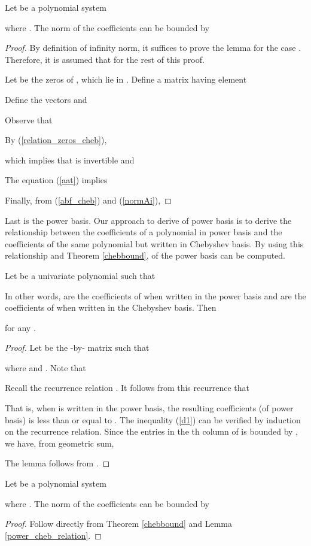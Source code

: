 \documentclass[12pt]{article}
\begin{document}
\begin{thm}
\label{chebbound} Let  be a polynomial system

where . The norm of the coefficients
can be bounded by

\end{thm}
\begin{proof}
By definition of infinity norm, it suffices to prove the lemma for
the case .  Therefore, it is assumed that
 for the rest of this proof.

Let   be the  zeros of ,
which lie in . Define a matrix  having element

Define the vectors  and

Observe that

By (\ref{relation_zeros_cheb}),

which implies that  is invertible and

The equation (\ref{aat}) implies

Finally, from (\ref{abf_cheb}) and (\ref{normAi}),

\end{proof}

Last is the power basis.  Our approach to derive  of power basis
is to derive the relationship between the coefficients of
a polynomial in power basis and the coefficients of the same
polynomial but written in Chebyshev basis.  By using this relationship
and Theorem \ref{chebbound},  of the power basis can be computed.

\begin{lemma}
\label{power_cheb_relation}
Let  be a univariate polynomial such that

In other words,  are the coefficients of  when written in the power
basis and  are the coefficients of  when written in the Chebyshev basis.
Then

for any .
\begin{proof}
Let  be the -by- matrix such that

where  and .  Note that

Recall the recurrence relation .
It follows from this recurrence that

That is, when  is written in the power basis, the resulting
coefficients (of power basis) is less than or equal to .  The
inequality (\ref{d1}) can be verified by induction on the recurrence
relation.  Since the entries in the th column of  is
bounded by , we have, from geometric sum,

The lemma follows from .
\end{proof}
\end{lemma}
\begin{thm}
\label{powerbound} Let  be a polynomial system

where . The norm of the coefficients
can be bounded by

\end{thm}
\begin{proof}
Follow directly from Theorem \ref{chebbound} and Lemma \ref{power_cheb_relation}.
\end{proof}
\end{document}
